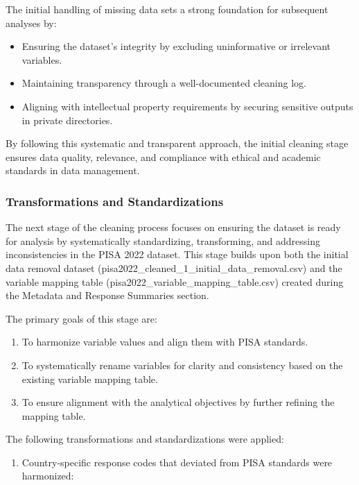 \documentclass[
]{article}
\providecommand{\tightlist}{%
  \setlength{\itemsep}{0pt}\setlength{\parskip}{0pt}}
\begin{document}
The initial handling of missing data sets a strong foundation for
subsequent analyses by:

\begin{itemize}
\item
  Ensuring the dataset's integrity by excluding uninformative or
  irrelevant variables.
\item
  Maintaining transparency through a well-documented cleaning log.
\item
  Aligning with intellectual property requirements by securing sensitive
  outputs in private directories.
\end{itemize}

By following this systematic and transparent approach, the initial
cleaning stage ensures data quality, relevance, and compliance with
ethical and academic standards in data management.

\hypertarget{transformations-and-standardizations}{%
\subsubsection{Transformations and
Standardizations}\label{transformations-and-standardizations}}

The next stage of the cleaning process focuses on ensuring the dataset
is ready for analysis by systematically standardizing, transforming, and
addressing inconsistencies in the PISA 2022 dataset. This stage builds
upon both the initial data removal dataset
(pisa2022\_cleaned\_1\_initial\_data\_removal.csv) and the variable
mapping table (pisa2022\_variable\_mapping\_table.csv) created during
the Metadata and Response Summaries section.

The primary goals of this stage are:

\begin{enumerate}
\def\labelenumi{\arabic{enumi}.}
\item
  To harmonize variable values and align them with PISA standards.
\item
  To systematically rename variables for clarity and consistency based
  on the existing variable mapping table.
\item
  To ensure alignment with the analytical objectives by further refining
  the mapping table.
\end{enumerate}

The following transformations and standardizations were applied:

\begin{enumerate}
\def\labelenumi{\arabic{enumi}.}
\tightlist
\item
  Country-specific response codes that deviated from PISA standards were
  harmonized:
\end{enumerate}
\end{document}
